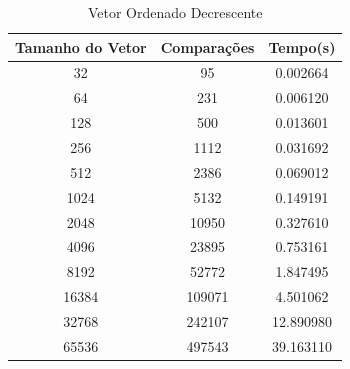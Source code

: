 \documentclass[12pt,a4paper,twoside]{report}
\begin{document}
\begin{table}[h]
  \centering
  \caption{Vetor Ordenado Decrescente \label{tab:od}}
  \begin{tabular}{ccc} \\\hline
  \textbf{Tamanho do Vetor} & \textbf{Comparações} & \textbf{Tempo(s)} \\\hline
  32                        & 95                   & 0.002664          \\\hline
  64                        & 231                  & 0.006120          \\\hline
  128                       & 500                  & 0.013601          \\\hline
  256                       & 1112                 & 0.031692          \\\hline
  512                       & 2386                 & 0.069012          \\\hline
  1024                      & 5132                 & 0.149191          \\\hline
  2048                      & 10950                & 0.327610          \\\hline
  4096                      & 23895                & 0.753161         \\\hline
  8192                      & 52772                & 1.847495        \\\hline
  16384                     & 109071               & 4.501062        \\\hline
  32768                     & 242107               & 12.890980        \\\hline
  65536                     & 497543               & 39.163110        \\\hline
  \end{tabular}
\end{table}
\end{document}
